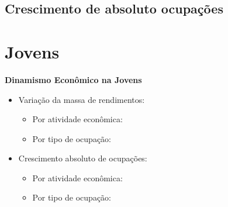 \documentclass[8pt]{beamer}
\begin{document}
\subsection{Crescimento de absoluto ocupações}

\begin{frame}
\textit{\hyperlink{indice_principal_amz_ti}{}}

\end{frame}

\begin{frame}
\textit{\hyperlink{indice_principal_amz_ti}{}}

\end{frame}

\section{Jovens}

\begin{frame}[label=indice_principal_amz_jovem]{}

\textit{\hyperlink{indice_principal}{}}

\textbf{Dinamismo Econômico na Jovens}
\vspace{2mm}

\begin{itemize}

\item{Variação da massa de rendimentos:
	\begin{itemize}
	\item{Por atividade econômica: \hyperlink{amzjovemrkngvmassaporcnae2dig}{}}
	\item{Por tipo de ocupação: \hyperlink{amzjovemrkngvmassaporcod2dig}{}}
	\end{itemize}
}
\vspace{1mm}

\item{Crescimento  absoluto de ocupações:
	\begin{itemize}
	\item{Por atividade econômica: \hyperlink{amzjovemrkngnocuporcnae2dig}{}}
	\item{Por tipo de ocupação: \hyperlink{amzjovemrkngnocuporcod2dig}{}}
	\end{itemize}
}
\vspace{1mm}

\end{itemize}

\end{frame}
\end{document}
